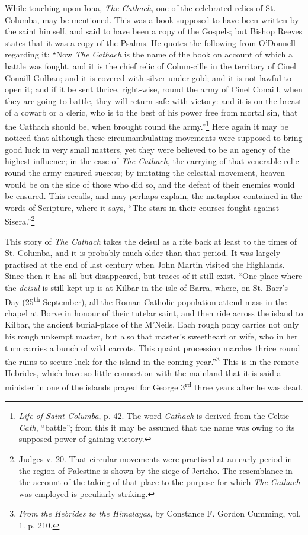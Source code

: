 \documentclass[a4paper, 11pt, oneside, polutonikogreek, english]{article}
\begin{document}
While touching upon Iona, \emph{The Cathach}, one of the celebrated relics of St. Columba, may be mentioned. This was a book supposed to have been written by the saint himself, and said to have been a copy of the Gospels; but Bishop Reeves states that it was a copy of the Psalms. He quotes the following from O'Donnell regarding it: ``Now \emph{The Cathach} is the name of the book on account of which a battle was fought, and it is the chief relic of Colum-cille in the territory of Cinel Conaill Gulban; and it is covered with silver under gold; and it is not lawful to open it; and if it be sent thrice, right-wise, round the army of Cinel Conaill, when they are going to battle, they will return safe with victory: and it is on the breast of a cowarb or a cleric, who is to the best of his power free from mortal sin, that the Cathach should be, when brought round the army.''\footnote{\emph{Life of Saint Columba}, p. 42. The word \emph{Cathach} is derived from the Celtic \emph{Cath}, ``battle''; from this it may be assumed that the name was owing to its supposed power of gaining victory.} Here again it may be noticed that although these circumambulating movements were supposed to bring good luck in very small matters, yet they were believed to be an agency of the highest influence; in the case of \emph{The Cathach}, the carrying of that venerable relic round the army ensured success; by imitating the celestial movement, heaven would be on the side of those who did so, and the defeat of their enemies would be ensured. This recalls, and may perhaps explain, the metaphor contained in the words of Scripture, where it says, ``The stars in their courses fought against Sisera.''\footnote{Judges v. 20. That circular movements were practised at an early period in the region of Palestine is shown by the siege of Jericho. The resemblance in the account of the taking of that place to the purpose for which \emph{The Cathach} was employed is peculiarly striking.}

This story of \emph{The Cathach} takes the deisul as a rite back at least to the times of St. Columba, and it is probably much older than that period. It was largely practised at the end of last century when John Martin visited the Highlands. Since then it has all but disappeared, but traces of it still exist. ``One place where the \emph{deisul} is still kept up is at Kilbar in the isle of Barra, where, on St. Barr's Day (25\textsuperscript{th} September), all the Roman Catholic population attend mass in the chapel at Borve in honour of their tutelar saint, and then ride across the island to Kilbar, the ancient burial-place of the M'Neils. Each rough pony carries not only his rough unkempt master, but also that master's sweetheart or wife, who in her turn carries a bunch of wild carrots. This quaint procession marches thrice round the ruins to secure luck for the island in the coming year.''\footnote{\emph{From the Hebrides to the Himalayas}, by Constance F. Gordon Cumming, vol. 1. p. 210.} This is in the remote Hebrides, which have so little connection with the mainland that it is said a minister in one of the islands prayed for George 3\textsuperscript{rd} three years after he was dead.
\end{document}
